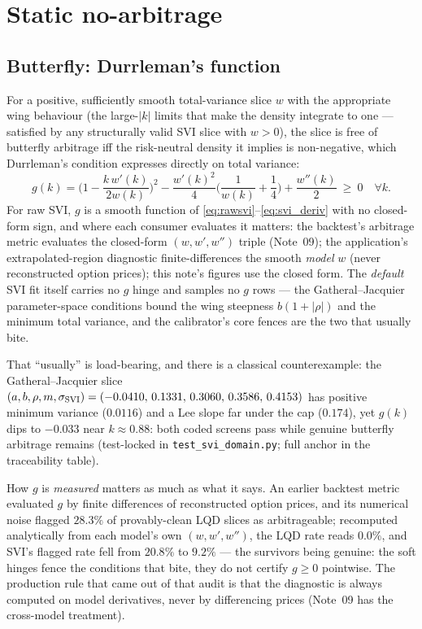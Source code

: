 \documentclass[11pt]{article}
\begin{document}
\section{Static no-arbitrage}
\label{sec:noarb}

\subsection{Butterfly: Durrleman's function}

For a positive, sufficiently smooth total-variance slice $w$ with the
appropriate wing behaviour (the large-$|k|$ limits that make the density
integrate to one --- satisfied by any structurally valid SVI slice with
$w>0$), the slice is free of butterfly arbitrage iff the risk-neutral density
it implies is non-negative, which Durrleman's condition expresses directly on
total variance:
\begin{equation}
g(k)=\Big(1-\frac{k\,w'(k)}{2w(k)}\Big)^2-\frac{w'(k)^2}{4}\Big(\frac{1}{w(k)}+\frac14\Big)+\frac{w''(k)}{2}\ \ge\ 0
\quad\forall k.
\label{eq:durrleman}
\end{equation}
For raw SVI, $g$ is a smooth function of \eqref{eq:rawsvi}--\eqref{eq:svi_deriv}
with no closed-form sign, and where each consumer evaluates it matters:
the backtest's arbitrage metric evaluates the closed-form $(w,w',w'')$ triple
(Note~09); the application's extrapolated-region diagnostic finite-differences
the smooth \emph{model} $w$ (never reconstructed option prices); this note's
figures use the closed form. The \emph{default} SVI fit itself carries no $g$
hinge and samples no $g$ rows --- the Gatheral--Jacquier parameter-space
conditions bound the wing steepness $b(1+|\rho|)$ and the minimum total
variance, and the calibrator's core fences are the two that usually bite.

That ``usually'' is load-bearing, and there is a classical counterexample:
the Gatheral--Jacquier slice
$(a,b,\rho,m,\sigma_{\mathrm{SVI}})=(-0.0410,\,0.1331,\,0.3060,\,0.3586,\,0.4153)$ has
positive minimum variance ($0.0116$) and a Lee slope far under the cap
($0.174$), yet $g(k)$ dips to $-0.033$ near $k\approx0.88$: both coded screens
pass while genuine butterfly arbitrage remains (test-locked in
\texttt{test\_svi\_domain.py}; full anchor in the traceability table).

How $g$ is \emph{measured} matters as much as what it says. An earlier
backtest metric evaluated $g$ by finite differences of reconstructed option
prices, and its numerical noise flagged $28.3\%$ of provably-clean LQD slices
as arbitrageable; recomputed analytically from each model's own
$(w,w',w'')$, the LQD rate reads $0.0\%$, and SVI's flagged rate fell from
$20.8\%$ to $9.2\%$ --- the survivors being genuine: the soft hinges fence
the conditions that bite, they do not certify $g\ge0$ pointwise. The
production rule that came out of that audit is that the diagnostic is always
computed on model derivatives, never by differencing prices (Note~09 has the
cross-model treatment).
\end{document}
